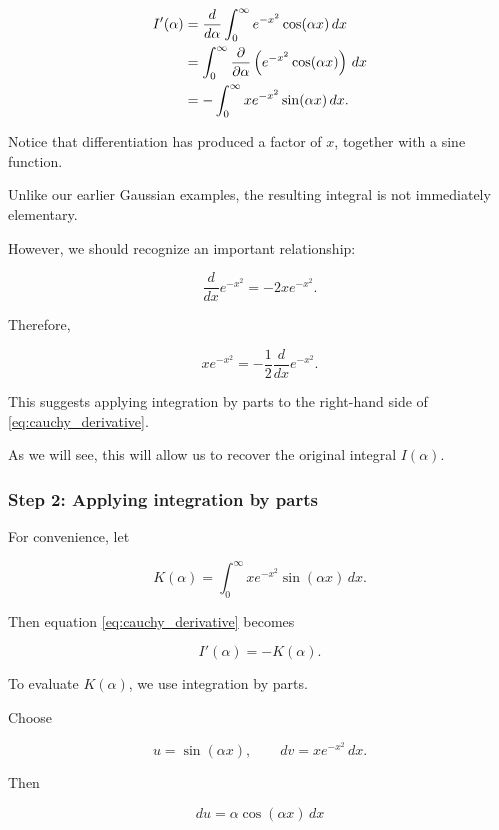 \documentclass[11pt,a4paper]{article}
\theoremstyle{definition}
\theoremstyle{remark}
\begin{document}
\begin{align}
    I'(\alpha)
    &=
    \frac{d}{d\alpha}
    \int_0^\infty
    e^{-x^2}\cos(\alpha x)\,dx
    \notag\\
    &=
    \int_0^\infty
    \frac{\partial}{\partial\alpha}
    \left(
    e^{-x^2}\cos(\alpha x)
    \right)\,dx
    \notag\\
    &=
    -\int_0^\infty
    x e^{-x^2}\sin(\alpha x)\,dx.
    \label{eq:cauchy_derivative}
\end{align}

Notice that differentiation
has produced a factor of $x$,
together with a sine function.

Unlike our earlier Gaussian
examples, the resulting integral
is not immediately elementary.

However, we should recognize
an important relationship:

\begin{equation}
    \frac{d}{dx}e^{-x^2}
    =
    -2xe^{-x^2}.
    \label{eq:cauchy_gaussian_derivative}
\end{equation}

Therefore,

\[
    xe^{-x^2}
    =
    -\frac12
    \frac{d}{dx}e^{-x^2}.
\]

This suggests applying
integration by parts to
the right-hand side of
\eqref{eq:cauchy_derivative}.

As we will see, this
will allow us to recover
the original integral
$I(\alpha)$.

\subsubsection*{Step 2: Applying
integration by parts}

For convenience, let

\begin{equation}
    K(\alpha)
    =
    \int_0^\infty
    xe^{-x^2}\sin(\alpha x)\,dx.
\end{equation}

Then equation
\eqref{eq:cauchy_derivative}
becomes

\[
    I'(\alpha)=-K(\alpha).
\]

To evaluate $K(\alpha)$,
we use integration by parts.

Choose

\[
    u=\sin(\alpha x),
    \qquad
    dv=xe^{-x^2}\,dx.
\]

Then

\[
    du=\alpha\cos(\alpha x)\,dx
\]
\end{document}
